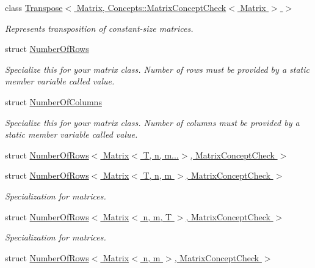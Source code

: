\begin{DoxyCompactItemize}
class \hyperlink{classFunG_1_1LinearAlgebra_1_1Transpose_3_01Matrix_00_01Concepts_1_1MatrixConceptCheck_3_01Matrix_01_4_01_4}{\-Transpose$<$ Matrix, Concepts\-::\-Matrix\-Concept\-Check$<$ Matrix $>$ $>$}
\begin{DoxyCompactList}\small\item\em \-Represents transposition of constant-\/size matrices. \end{DoxyCompactList}\item 
struct \hyperlink{structFunG_1_1LinearAlgebra_1_1NumberOfRows}{\-Number\-Of\-Rows}
\begin{DoxyCompactList}\small\item\em \-Specialize this for your matrix class. \-Number of rows must be provided by a static member variable called value. \end{DoxyCompactList}\item 
struct \hyperlink{structFunG_1_1LinearAlgebra_1_1NumberOfColumns}{\-Number\-Of\-Columns}
\begin{DoxyCompactList}\small\item\em \-Specialize this for your matrix class. \-Number of columns must be provided by a static member variable called value. \end{DoxyCompactList}\item 
struct \hyperlink{structFunG_1_1LinearAlgebra_1_1NumberOfRows_3_01Matrix_3_01T_00_01n_00_01m_8_8_8_4_00_01MatrixConceptCheck_01_4}{\-Number\-Of\-Rows$<$ Matrix$<$ T, n, m...$>$, Matrix\-Concept\-Check $>$}
\item 
struct \hyperlink{structFunG_1_1LinearAlgebra_1_1NumberOfRows_3_01Matrix_3_01T_00_01n_00_01m_01_4_00_01MatrixConceptCheck_01_4}{\-Number\-Of\-Rows$<$ Matrix$<$ T, n, m $>$, Matrix\-Concept\-Check $>$}
\begin{DoxyCompactList}\small\item\em \-Specialization for matrices. \end{DoxyCompactList}\item 
struct \hyperlink{structFunG_1_1LinearAlgebra_1_1NumberOfRows_3_01Matrix_3_01n_00_01m_00_01T_01_4_00_01MatrixConceptCheck_01_4}{\-Number\-Of\-Rows$<$ Matrix$<$ n, m, T $>$, Matrix\-Concept\-Check $>$}
\begin{DoxyCompactList}\small\item\em \-Specialization for matrices. \end{DoxyCompactList}\item 
struct \hyperlink{structFunG_1_1LinearAlgebra_1_1NumberOfRows_3_01Matrix_3_01n_00_01m_01_4_00_01MatrixConceptCheck_01_4}{\-Number\-Of\-Rows$<$ Matrix$<$ n, m $>$, Matrix\-Concept\-Check $>$}

\end{DoxyCompactItemize}
